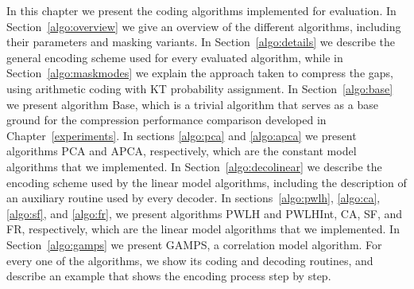

In this chapter we present the coding algorithms implemented for evaluation. In Section~\ref{algo:overview} we give an overview of the different algorithms, including their parameters and masking variants. In Section~\ref{algo:details} we describe the general encoding scheme used for every evaluated algorithm, while in Section~\ref{algo:maskmodes} we explain the approach taken to compress the gaps, using arithmetic coding with KT probability assignment. In Section~\ref{algo:base} we present algorithm Base, which is a trivial algorithm that serves as a base ground for the compression performance comparison developed in Chapter~\ref{experiments}. In sections \ref{algo:pca} and \ref{algo:apca} we present algorithms PCA and APCA, respectively, which are the constant model algorithms that we implemented. In Section~\ref{algo:decolinear} we describe the encoding scheme used by the linear model algorithms, including the description of an auxiliary routine used by every decoder. In sections~\ref{algo:pwlh}, \ref{algo:ca}, \ref{algo:sf}, and \ref{algo:fr}, we present algorithms PWLH and PWLHInt, CA, SF, and FR, respectively, which are the linear model algorithms that we implemented. In Section~\ref{algo:gamps} we present GAMPS, a correlation model algorithm. For every one of the algorithms, we show its coding and decoding routines, and describe an example that shows the encoding process step by step.

